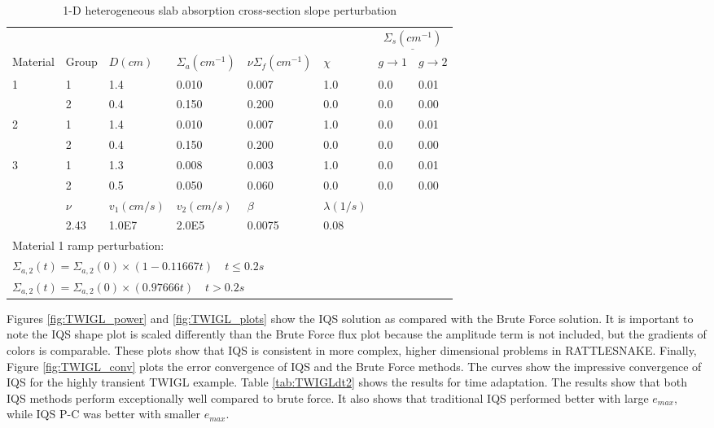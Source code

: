\documentclass[10pt]{scrartcl}
\begin{document}
\begin{table}[!htbp]
\begin{center}
\caption{1-D heterogeneous slab absorption cross-section slope perturbation}
\label{tab:TWIGL_mat}
\begin{tabular}{llllllll}
\hline
  &  &  &  &  &  &  \multicolumn{2}{c}{$\underline{\Sigma_s (cm^{-1})} $} \\
Material & Group & $D (cm)$ & $\Sigma_a (cm^{-1})$ & $\nu\Sigma_f (cm^{-1})$ & $\chi$ & $g \rightarrow 1$ & $g \rightarrow 2$ \\
\hline
1 & 1 & 1.4 & 0.010 & 0.007 & 1.0 & 0.0 & 0.01 \\
  & 2 & 0.4 & 0.150 & 0.200 & 0.0 & 0.0 & 0.00  \\
2 & 1 & 1.4 & 0.010 & 0.007 & 1.0 & 0.0 & 0.01  \\
  & 2 & 0.4 & 0.150 & 0.200 & 0.0 & 0.0 & 0.00  \\
3 & 1 & 1.3 & 0.008 & 0.003 & 1.0 & 0.0 & 0.01  \\
  & 2 & 0.5 & 0.050 & 0.060 & 0.0 & 0.0 & 0.00  \\
\hline
  & $\nu$ & $v_1 (cm/s)$ & $v_2 (cm/s)$ & $\beta$ & $\lambda (1/s)$ &   &   \\
\hline
  & 2.43 & 1.0E7 & 2.0E5 & 0.0075 & 0.08 &   &   \\
\hline
 \multicolumn{8}{l}{\footnotesize Material 1 ramp perturbation:} \\
\multicolumn{8}{l}{\footnotesize $\Sigma_{a,2}(t)=\Sigma_{a,2}(0) \times (1-0.11667t) \quad t \leq 0.2 s$} \\
\multicolumn{8}{l}{\footnotesize $\Sigma_{a,2}(t)=\Sigma_{a,2}(0) \times (0.97666t) \quad t > 0.2 s$} \normalsize
\end{tabular}
\end{center}
\end{table}

Figures \ref{fig:TWIGL_power} and \ref{fig:TWIGL_plots} show the IQS  solution as compared with the Brute Force solution.  It is important to note the IQS shape plot is scaled differently than the Brute Force flux plot because the amplitude term is not included, but the gradients of colors is comparable.  These plots show that IQS is consistent in more complex, higher dimensional problems in RATTLESNAKE.  Finally, Figure \ref{fig:TWIGL_conv} plots the error convergence of IQS and the Brute Force methods.  The curves show the impressive convergence of IQS for the highly transient TWIGL example.  Table \ref{tab:TWIGLdt2} shows the results for time adaptation.  The results show that both IQS methods perform exceptionally well compared to brute force.  It also shows that traditional IQS performed better with large $e_{max}$, while IQS P-C was better with smaller $e_{max}$.
\end{document}
